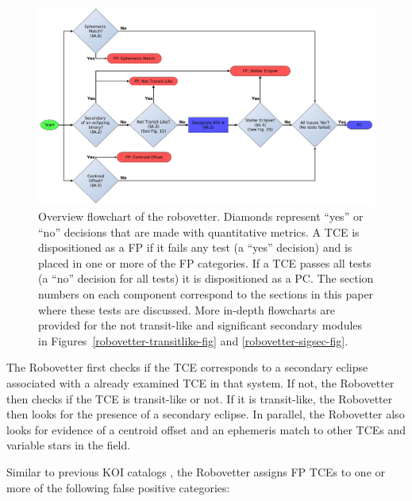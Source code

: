 \begin{figure}[ht]
\centering
\includegraphics[width=0.9\linewidth]{RoboVetter-Diagram-V4-Overview.pdf}
\caption{Overview flowchart of the robovetter. Diamonds represent ``yes'' or ``no'' decisions that are made with quantitative metrics. A TCE is dispositioned as a FP if it fails any test (a ``yes'' decision) and is placed in one or more of the FP categories. If a TCE passes all tests (a ``no'' decision for all tests) it is dispositioned as a PC. The section numbers on each component correspond to the sections in this paper where these tests are discussed. More in-depth flowcharts are provided for the not transit-like and significant secondary modules in Figures~\ref{robovetter-transitlike-fig} and \ref{robovetter-sigsec-fig}.}
\label{robovetter-overview-fig}
\end{figure}


The Robovetter first checks if the TCE corresponds to a secondary eclipse associated with a already examined TCE in that system. If not, the Robovetter then checks if the TCE is transit-like or not. If it is transit-like, the Robovetter then looks for the presence of a secondary eclipse. In parallel, the Robovetter also looks for evidence of a centroid offset and an ephemeris match to other TCEs and variable stars in the \kepler{} field. 

\label{s:majorflags}
Similar to previous KOI catalogs \citep{Rowe2015cat, Mullally2015cat, Coughlin2016}, the Robovetter assigns FP TCEs to one or more of the following false positive categories:


